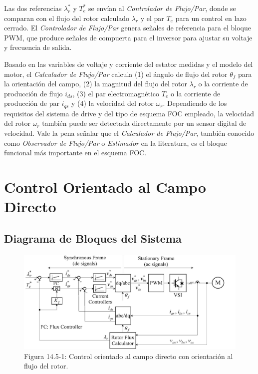 \documentclass[letterpaper,12pt]{article}
\begin{document}
Las dos referencias $\lambda_r^*$ y $T_e^*$ se envían al \textit{Controlador de Flujo/Par}, donde se comparan con el flujo del rotor calculado $\lambda_r$ y el par $T_e$ para un control en lazo cerrado. El \textit{Controlador de Flujo/Par} genera señales de referencia para el bloque PWM, que produce señales de compuerta para el inversor para ajustar su voltaje y frecuencia de salida.

Basado en las variables de voltaje y corriente del estator medidas y el modelo del motor, el \textit{Calculador de Flujo/Par} calcula (1) el ángulo de flujo del rotor $\theta_f$ para la orientación del campo, (2) la magnitud del flujo del rotor $\lambda_r$ o la corriente de producción de flujo $i_{ds}$, (3) el par electromagnético $T_e$ o la corriente de producción de par $i_{qs}$ y (4) la velocidad del rotor $\omega_r$. Dependiendo de los requisitos del sistema de drive y del tipo de esquema FOC empleado, la velocidad del rotor $\omega_r$ también puede ser detectada directamente por un sensor digital de velocidad. Vale la pena señalar que el \textit{Calculador de Flujo/Par}, también conocido como \textit{Observador de Flujo/Par} o \textit{Estimador} en la literatura, es el bloque funcional más importante en el esquema FOC.

\clearpage
\section{Control Orientado al Campo Directo}

\subsection{Diagrama de Bloques del Sistema}

\begin{figure}[ht]
\centering
\includegraphics{graficos/img13.jpg}
\caption{Figura 14.5-1: Control orientado al campo directo con orientación al flujo del rotor.}
\end{figure}
\FloatBarrier
\end{document}
